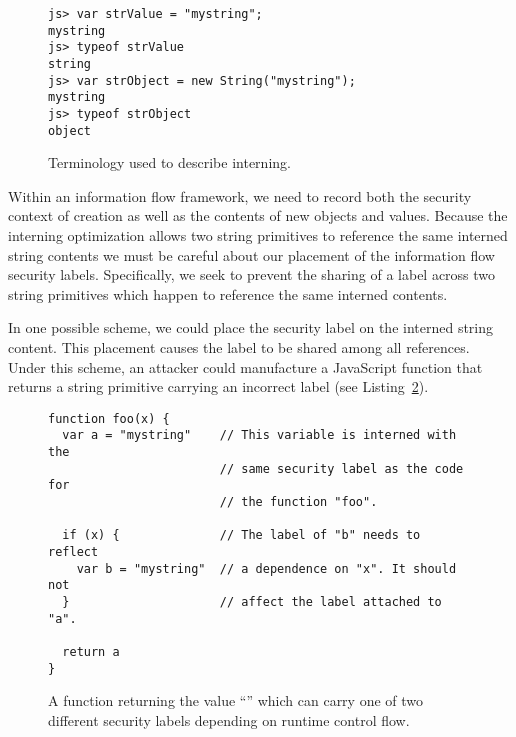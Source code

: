 \begin{figure}[h]
\begin{lstlisting}
js> var strValue = "mystring";
mystring
js> typeof strValue
string
js> var strObject = new String("mystring");
mystring
js> typeof strObject
object
\end{lstlisting}
\caption{Terminology used to describe interning.}
\label{list:intern}
\end{figure}

Within an information flow framework, we need to record both the security context of creation as well as the contents of new objects and values.
Because the interning optimization allows two string primitives to reference the same interned string contents we must be careful about our placement of the information flow security labels.
Specifically, we seek to prevent the sharing of a label across two string primitives which happen to reference the same interned contents.

In one possible scheme, we could place the security label on the interned string content.
This placement causes the label to be shared among all references.
Under this scheme, an attacker could manufacture a JavaScript function that returns a string primitive carrying an incorrect label (see Listing~\ref{list:interned-string}).

\begin{figure}[h]
\begin{lstlisting}
function foo(x) {
  var a = "mystring"    // This variable is interned with the
                        // same security label as the code for
                        // the function "foo".

  if (x) {              // The label of "b" needs to reflect
    var b = "mystring"  // a dependence on "x". It should not
  }                     // affect the label attached to "a".

  return a
}
\end{lstlisting}
  \caption{A function returning the value ``'' which can carry one of two different security labels depending on runtime control flow.}
  \label{list:interned-string}
\end{figure}

